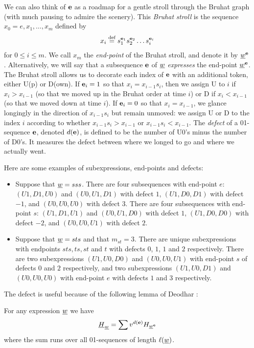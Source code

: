 We can also think of ${\mathbf e}$ as a roadmap for a gentle stroll through the Bruhat graph (with much pausing to admire the scenery). This \emph{Bruhat stroll} is the sequence $x_0=e, x_1,
\dots, x_m$ defined by \[ x_i \stackrel{\mbox{\scriptsize{def}}}{=} s_1^{{\mathbf e}_1} s_2^{{\mathbf e}_2} \dots s_i^{{\mathbf e}_i} \] for $0 \le i \le m$. We call $x_m$ the \emph{end-point} of the Bruhat stroll, and denote it by $\underline{w}^{{\mathbf e}}$. Alternatively, we will say that a subsequence ${\mathbf e}$ of $\underline{w}$ \emph{expresses} the end-point $\underline{w}^{{\mathbf e}}$.
The Bruhat stroll allows us to decorate each index of ${\mathbf e}$ with an additional token, either U(p) or D(own). If ${\mathbf e}_i=1$ so that $x_i = x_{i-1}s_i$, then we assign U to $i$ if $x_i >
x_{i-1}$ (so that we moved up in the Bruhat order at time $i$) or D if $x_i < x_{i-1}$ (so that we moved down at time $i$). If ${\mathbf e}_i=0$ so that $x_i = x_{i-1}$, we glance longingly in the
direction of $x_{i-1}s_i$ but remain unmoved: we assign U or D to the index $i$ according to whether $x_{i-1}s_i > x_{i-1}$ or $x_{i-1}s_i < x_{i-1}$. The \emph{defect} of a 01-sequence
${\mathbf e}$, denoted $d({\mathbf e})$, is defined to be the number of U0's minus the number of D0's. It measures the defect between where we longed to go and where we actually went.

\begin{ex} \label{ex:defects}
Here are some examples of subexpressions, end-points and defects:
  \begin{itemize}
  \item Suppose that $\underline{w}=sss$. There are four subsequences with end-point $e$: $(U1,D1,U0)$ and $(U0,U1,D1)$ with defect $1$, $(U1,D0,D1)$ with defect $-1$, and $(U0,U0,U0)$
with defect $3$. There are four subsequences with end-point $s$: $(U1,D1,U1)$ and $(U0,U1,D0)$ with defect $1$, $(U1,D0,D0)$ with defect $-2$, and $(U0,U0,U1)$ with defect $2$.
  \item Suppose that $\underline{w} = sts$ and that $m_{st}  = 3$. There are unique subexpressions with endpoints $sts, ts, st$ and $t$ with defects $0$, $1$, $1$ and $2$ respectively. There are two subexpressions $(U1, U0, D0)$ and $(U0, U0, U1)$ with end-point $s$ of defects $0$ and $2$ respectively, and two subexpressions $(U1, U0, D1)$ and $(U0, U0, U0)$ with end-point $e$ with defects $1$ and $3$ respectively.
  \end{itemize}
\end{ex}

The defect is useful because of the following lemma of Deodhar \cite{DD}:

\begin{lem} \label{lem:defects}
For any expression $\underline{w}$ we have
\[
\underline{H}_{\underline{w}} = \sum v^{d({\mathbf e})}H_{\underline{w}^{{\mathbf e}}}
\]
where the sum runs over all 01-sequences of length $\ell(\underline{w})$.
\end{lem}

